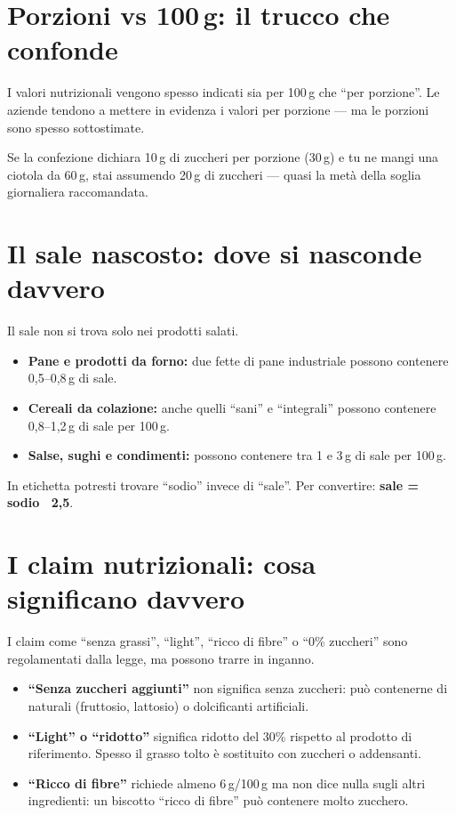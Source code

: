 \documentclass[a5paper,12pt,oneside,openany]{book}
\newcommand{\boxgiallo}[2]{%
  \begin{tcolorbox}[boxbase,
    colback=giallo!12!white, colframe=giallo!80!black, title={#1}]
  #2\end{tcolorbox}}
\newcommand{\boxinfo}[2]{%
  \begin{tcolorbox}[boxbase,
    colback=blinfo!8!white, colframe=blinfo, title={#1}]
  #2\end{tcolorbox}}
\begin{document}
\section{Porzioni vs 100\,g: il trucco che confonde}

I valori nutrizionali vengono spesso indicati sia per 100\,g che ``per
porzione''. Le aziende tendono a mettere in evidenza i valori per porzione
--- ma le porzioni sono spesso sottostimate.

\boxgiallo{Esempio}{Se la confezione dichiara 10\,g di zuccheri per
porzione (30\,g) e tu ne mangi una ciotola da 60\,g, stai assumendo 20\,g
di zuccheri --- quasi la metà della soglia giornaliera raccomandata.}

\section{Il sale nascosto: dove si nasconde davvero}

Il sale non si trova solo nei prodotti salati.

\begin{itemize}
  \item \textbf{Pane e prodotti da forno:} due fette di pane industriale
    possono contenere 0,5--0,8\,g di sale.
  \item \textbf{Cereali da colazione:} anche quelli ``sani'' e ``integrali''
    possono contenere 0,8--1,2\,g di sale per 100\,g.
  \item \textbf{Salse, sughi e condimenti:} possono contenere tra 1 e
    3\,g di sale per 100\,g.
\end{itemize}

\boxinfo{Nota bene}{In etichetta potresti trovare ``sodio'' invece di
``sale''. Per convertire: \textbf{sale = sodio \texttimes\ 2,5}.}

\section{I claim nutrizionali: cosa significano davvero}

I claim come ``senza grassi'', ``light'', ``ricco di fibre'' o ``0\% zuccheri''
sono regolamentati dalla legge, ma possono trarre in inganno.

\begin{itemize}
  \item \textbf{``Senza zuccheri aggiunti''} non significa senza zuccheri:
    può contenerne di naturali (fruttosio, lattosio) o dolcificanti
    artificiali.
  \item \textbf{``Light'' o ``ridotto''} significa ridotto del 30\%
    rispetto al prodotto di riferimento. Spesso il grasso tolto è
    sostituito con zuccheri o addensanti.
  \item \textbf{``Ricco di fibre''} richiede almeno 6\,g/100\,g ma non
    dice nulla sugli altri ingredienti: un biscotto ``ricco di fibre''
    può contenere molto zucchero.
\end{itemize}
\end{document}
